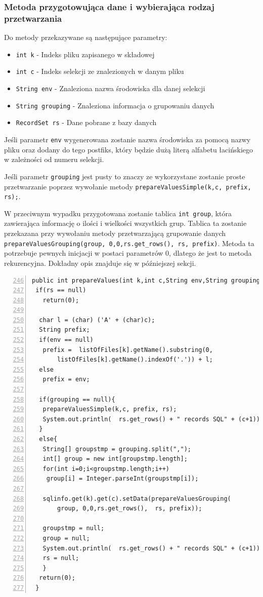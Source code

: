\subsubsection*{Metoda przygotowująca dane i wybierająca rodzaj przetwarzania}

Do metody przekazywane są następujące parametry:
\begin{itemize}
\item \texttt{int k} - Indeks pliku zapisanego w składowej
\item \texttt{int c} - Indeks selekcji ze znalezionych w danym pliku
\item\texttt{String  env} - Znaleziona nazwa środowiska dla danej selekcji
\item \texttt{String  grouping} - Znaleziona informacja o grupowaniu danych
\item \texttt{RecordSet rs} - Dane pobrane z bazy danych
\end{itemize}
\vspace{5mm}
Jeśli parametr \texttt{env} wygenerowana zostanie nazwa środowiska za pomocą nazwy pliku oraz dodany do tego postfiks, który będzie dużą literą alfabetu łacińskiego w zależności od numeru selekcji. 
\par
Jeśli parametr \texttt{grouping} jest pusty to znaczy ze wykorzystane zostanie proste przetwarzanie poprzez wywołanie metody \texttt{prepareValuesSimple(k,c, prefix, rs);}.
\par
 W przeciwnym wypadku przygotowana zostanie tablica \texttt{int group}, 
 która zawierająca informację o ilości i wielkości wszystkich grup. Tablica ta zostanie przekazana przy wywołaniu metody
 przetwarzającą grupowanie danych \texttt{prepareValuesGrouping(group, 0,0,rs.get\_rows(),  rs, prefix)}. Metoda ta potrzebuje pewnych inicjacji w postaci parametrów 0, dlatego że jest to metoda rekurencyjna. Dokładny opis znajduje się w późniejszej sekcji.
 
 \begin{lstlisting}[numbers=left,firstnumber=246]
public int prepareValues(int k,int c,String env,String grouping,RecordSet rs){
 if(rs == null)
   return(0);

  char l = (char) ('A' + (char)c);
  String prefix;
  if(env == null)
   prefix =  listOfFiles[k].getName().substring(0,
	   listOfFiles[k].getName().indexOf('.')) + l;
  else
   prefix = env;
      
  if(grouping == null){
   prepareValuesSimple(k,c, prefix, rs);
   System.out.println(  rs.get_rows() + " records SQL" + (c+1));  
  }
  else{
   String[] groupstmp = grouping.split(",");
   int[] group = new int[groupstmp.length];
   for(int i=0;i<groupstmp.length;i++)
    group[i] = Integer.parseInt(groupstmp[i]);
           
   sqlinfo.get(k).get(c).setData(prepareValuesGrouping(
	   group, 0,0,rs.get_rows(),  rs, prefix)); 
          
   groupstmp = null;
   group = null;
   System.out.println(  rs.get_rows() + " records SQL" + (c+1));   
   rs = null;
   }
  return(0);  
 }
  \end{lstlisting}


